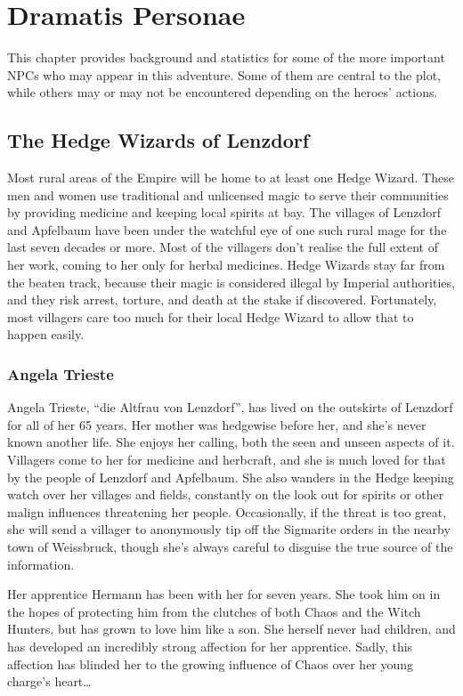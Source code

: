 \chapter{Dramatis Personae}\label{ch:dramatis-personae}
This chapter provides background and statistics for some of the more important
NPCs who may appear in this adventure. Some of them are central to the plot,
while others may or may not be encountered depending on the heroes' actions.

\section{The Hedge Wizards of Lenzdorf}
Most rural areas of the Empire will be home to at least one Hedge Wizard. These
men and women use traditional and unlicensed magic to serve their communities
by providing medicine and keeping local spirits at bay. The villages of Lenzdorf
and Apfelbaum have been under the watchful eye of one such rural mage for
the last seven decades or more. Most of the villagers don't realise the full
extent of her work, coming to her only for herbal medicines. Hedge Wizards stay
far from the beaten track, because their magic is considered illegal by Imperial
authorities, and they risk arrest, torture, and death at the stake if
discovered. Fortunately, most villagers care too much for their local Hedge
Wizard to allow that to happen easily.

\subsection{Angela Trieste}
Angela Trieste, ``die Altfrau von Lenzdorf'', has lived on the outskirts of
Lenzdorf for all of her 65 years.
Her mother was hedgewise before her, and she's never known another life. She
enjoys her calling, both the seen and unseen aspects of it. Villagers come to
her for medicine and herbcraft, and she is much loved for that by the people of
Lenzdorf and Apfelbaum. She also wanders in the Hedge keeping watch over her
villages and fields, constantly on the look out for spirits or other malign
influences threatening her people. Occasionally, if the threat is too great,
she will send a villager to anonymously tip off the Sigmarite orders in the
nearby town of Weissbruck, though she's always careful to disguise the true
source of the information.

Her apprentice Hermann has been with her for seven years. She took him on in
the hopes of protecting him from the clutches of both Chaos and the Witch
Hunters, but has grown to love him like a son. She herself never had children,
and has developed an incredibly strong affection for her apprentice. Sadly, this
affection has blinded her to the growing influence of Chaos over her young
charge's heart\ldots


